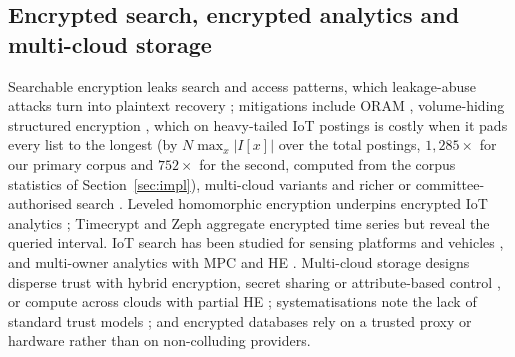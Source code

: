 \documentclass[a4paper,fleqn]{cas-sc}
\begin{document}
\subsection{Encrypted search, encrypted analytics and multi-cloud storage}
Searchable encryption leaks search and access patterns, which leakage-abuse
attacks turn into plaintext recovery
\citep{islam2012access,cash2015leakage,grubbs2017leakage}; mitigations include
ORAM \citep{goldreich1996software}, volume-hiding structured encryption
\citep{kamara2019computationally,patel2019mitigating}, which on heavy-tailed
IoT postings is costly when it pads every list to the longest (by
$N\max_x|I[x]|$ over the total postings, $1{,}285\times$ for our primary corpus
and $752\times$ for the second, computed from the corpus statistics of
Section~\ref{sec:impl}), multi-cloud variants
\citep{xu2021privacy,xu2023symmetric} and richer or committee-authorised
search \citep{zhang2024secure,yang2023dynamic,du2022lightweight}. Leveled
homomorphic encryption \citep{fan2012somewhat,cryptoeprint:2016/421} underpins
encrypted IoT analytics \citep{halder2022enabling,kamble2024homomorphic};
Timecrypt \citep{timecrypt} and Zeph \citep{zeph} aggregate encrypted time
series but reveal the queried interval. IoT search has been studied for sensing
platforms \citep{xu2019achieving} and vehicles \citep{wu2024distributed}, and
multi-owner analytics with MPC and HE \citep{verma2025secure}. Multi-cloud
storage designs disperse trust with hybrid encryption, secret sharing or
attribute-based control \citep{bharot2025cloudlock,muthuvel2026design}, or
compute across clouds with partial HE \citep{wang2020shamc}; systematisations
note the lack of standard trust models \citep{cryptoeprint:2026/207}; and
encrypted databases \citep{poddar2019arx,crooks2018obladi,dauterman2021snoopy}
rely on a trusted proxy or hardware rather than on non-colluding providers.
\end{document}
